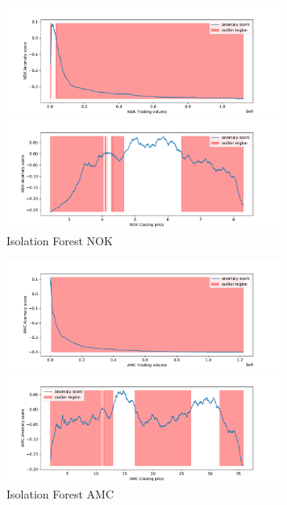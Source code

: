 \documentclass[12pt,twoside]{report}
\begin{document}
\begin{figure}[H]
\begin{multicols}{2}
    \includegraphics[width=9cm]{../code/figures/if_trading_NOK.pdf}\par 
    \includegraphics[width=9cm]{../code/figures/if_closing_NOK.pdf}\par 
\end{multicols}
\caption{Isolation Forest NOK}
\end{figure}

\begin{figure}[H]
\begin{multicols}{2}
    \includegraphics[width=9cm]{../code/figures/if_trading_AMC.pdf}\par 
    \includegraphics[width=9cm]{../code/figures/if_closing_AMC.pdf}\par 
\end{multicols}
\caption{Isolation Forest AMC}
\label{fig:if-AMC}
\end{figure}
\end{document}
